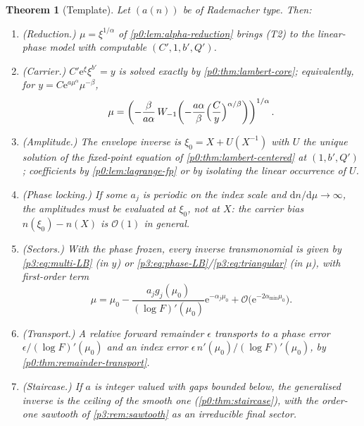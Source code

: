 \documentclass[11pt,a4paper,oneside]{book}
\theoremstyle{plain}
\newtheorem{theorem}{Theorem}[chapter]
\theoremstyle{definition}
\theoremstyle{remark}
\newcommand{\e}{\mathrm{e}}
\newcommand{\dd}{\mathrm{d}}
\newcommand{\bigO}{\mathcal{O}}
\newcommand{\Wlam}{W}
\begin{document}
\begin{theorem}[Template]\label{p3:thm:template}
Let $(a(n))$ be of Rademacher type. Then:
\begin{enumerate}
\item \textup{(Reduction.)} $\mu=\xi^{1/\alpha}$ of \cref{p0:lem:alpha-reduction} brings
\textup{(T2)} to the linear-phase model with computable $(C',1,b',Q')$.
\item \textup{(Carrier.)} $C'\e^{\xi}\xi^{b'}=y$ is solved exactly by
\cref{p0:thm:lambert-core}; equivalently, for $y=C\e^{a\mu^{\alpha}}\mu^{-\beta}$,
      \begin{equation}\label{p3:eq:general-carrier}
       \mu=\left(-\frac{\beta}{a\alpha}\,\Wlam_{-1}\!\left(-\frac{a\alpha}{\beta}
       \Bigl(\frac Cy\Bigr)^{\alpha/\beta}\right)\right)^{1/\alpha}.
      \end{equation}
\item \textup{(Amplitude.)} The envelope inverse is $\xi_{0}=X+U(X^{-1})$ with $U$ the
unique solution of the fixed-point equation of \cref{p0:thm:lambert-centered} at $(1,b',Q')$;
coefficients by \cref{p0:lem:lagrange-fp} or by isolating the linear occurrence of $U$.
\item \textup{(Phase locking.)} If some $a_{j}$ is periodic on the index scale and
$\dd n/\dd\mu\to\infty$, the amplitudes must be evaluated at $\xi_{0}$, not at $X$: the carrier
bias $n(\xi_{0})-n(X)$ is $\bigO(1)$ in general.
\item \textup{(Sectors.)} With the phase frozen, every inverse transmonomial is given by
\cref{p3:eq:multi-LB} (in $y$) or \cref{p3:eq:phase-LB}/\cref{p3:eq:triangular} (in $\mu$), with
first-order term
      \begin{equation}\label{p3:eq:general-first}
       \mu=\mu_{0}-\frac{a_{j}g_{j}(\mu_{0})}{(\log F)'(\mu_{0})}\e^{-\alpha_{j}\mu_{0}}
       +\bigO\bigl(\e^{-2\alpha_{\min}\mu_{0}}\bigr).
      \end{equation}
\item \textup{(Transport.)} A relative forward remainder $\epsilon$ transports to a phase
error $\epsilon/(\log F)'(\mu_{0})$ and an index error $\epsilon\,n'(\mu_{0})/(\log F)'(\mu_{0})$,
by \cref{p0:thm:remainder-transport}.
\item \textup{(Staircase.)} If $a$ is integer valued with gaps bounded below, the
generalised inverse is the ceiling of the smooth one (\cref{p0:thm:staircase}), with the order-one
sawtooth of \cref{p3:rem:sawtooth} as an irreducible final sector.
\end{enumerate}
\end{theorem}
\end{document}
